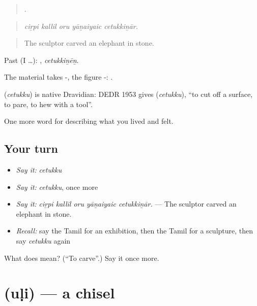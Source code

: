 \begin{quote}
    .
\end{quote}

\begin{quote}
\emph{ciṟpi kallil oru yāṉaiyaic cetukkiṉār.}
\end{quote}

\begin{quote}
The sculptor carved an elephant in stone.
\end{quote}

Past (I …): , \emph{cetukkiṉēṉ}.

The material takes -, the figure -:   .

\begin{cousinweb}
\textbf{} (\emph{cetukku}) is native Dravidian: DEDR 1953 gives  (\emph{cetukku}), \textquotedblleft{}to cut off a surface, to pare, to hew with a tool\textquotedblright{}.
\end{cousinweb}

\begin{grammarlens}[title={What you've built}]
One more word for describing what you lived and felt.
\end{grammarlens}

\subsection*{Your turn}
\begin{itemize}
\raggedright
  \item \emph{Say it:} \emph{cetukku}
  \item \emph{Say it:} \emph{cetukku}, once more
  \item \emph{Say it:} \emph{ciṟpi kallil oru yāṉaiyaic cetukkiṉār.} — The sculptor carved an elephant in stone.
  \item \emph{Recall:} say the Tamil for an exhibition, then the Tamil for a sculpture, then say \emph{cetukku} again
\end{itemize}

\begin{tcolorbox}[breakable,colback=teal!4,colframe=teal!35!black,title={Before you move on}]
What does  mean? (\textquotedblleft{}To carve\textquotedblright{}.) Say it once more.
\end{tcolorbox}
\section[\texorpdfstring{\ta{உளி} (uḷi)}{உளி (uḷi)}]{ (uḷi) — a chisel}

